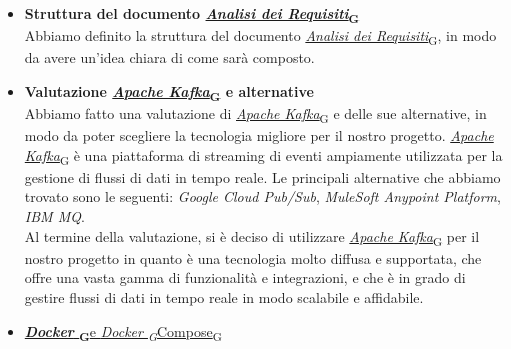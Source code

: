 \documentclass[italian,12pt]{article}
\begin{document}
\begin{itemize}
	\item \textbf{Struttura del documento \href{https://7last.github.io/docs/rtb/documentazione-interna/glossario#analisi-dei-requisiti}{\textit{Analisi dei Requisiti}\textsubscript{G}}} \\
	Abbiamo definito la struttura del documento \href{https://7last.github.io/docs/rtb/documentazione-interna/glossario#analisi-dei-requisiti}{\textit{Analisi dei Requisiti}\textsubscript{G}}, in modo da avere un'idea chiara di come sarà composto.
	\item \textbf{Valutazione \href{https://7last.github.io/docs/rtb/documentazione-interna/glossario#apache-kafka}{\textit{Apache Kafka}\textsubscript{G}} e alternative} \\
	Abbiamo fatto una valutazione di \href{https://7last.github.io/docs/rtb/documentazione-interna/glossario#apache-kafka}{\textit{Apache Kafka}\textsubscript{G}} e delle sue alternative, in modo da poter scegliere la tecnologia migliore per il nostro progetto. \href{https://7last.github.io/docs/rtb/documentazione-interna/glossario#apache-kafka}{\textit{Apache Kafka}\textsubscript{G}} è una piattaforma di streaming di eventi ampiamente utilizzata per la gestione di flussi di dati in tempo reale. Le principali alternative che abbiamo trovato sono le seguenti: \textit{Google Cloud Pub/Sub}, \textit{MuleSoft Anypoint Platform}, \textit{IBM MQ}. \\
	Al termine della valutazione, si è deciso di utilizzare \href{https://7last.github.io/docs/rtb/documentazione-interna/glossario#apache-kafka}{\textit{Apache Kafka}\textsubscript{G}} per il nostro progetto in quanto è una tecnologia molto diffusa e supportata, che offre una vasta gamma di funzionalità e integrazioni, e che è in grado di gestire flussi di dati in tempo reale in modo scalabile e affidabile.
	\item \href{https://7last.github.io/docs/rtb/documentazione-interna/glossario#docker}{\textbf{\textit{Docker} \textsubscript{G}}e \href{https://7last.github.io/docs/rtb/documentazione-interna/glossario#docker-compose}{\href{https://7last.github.io/docs/rtb/documentazione-interna/glossario#docker}{\textit{Docker \textsubscript{G}}Compose}\textsubscript{G}}} \\

\end{itemize}
\end{document}
